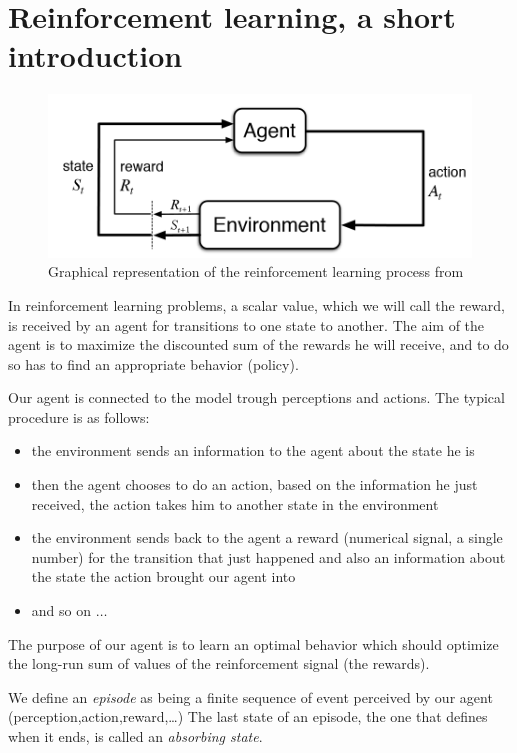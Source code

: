 \documentclass[14pt,a4paper]{article}
\theoremstyle{definition}
\begin{document}
\section{Reinforcement learning, a short introduction}

\begin{figure}[H]
\centering
\includegraphics[scale=0.5]{img/RL_graph.png}
\caption{Graphical representation of the reinforcement learning process from \citep{Sutton}}
\label{RL}
\end{figure}

In reinforcement learning problems, a scalar value, which we will call the reward, is received by an agent for transitions to one state to another. The aim of the agent is to maximize the discounted sum of the rewards he will receive, and to do so has to find an appropriate behavior (policy).


Our agent is connected to the model trough perceptions and actions. The typical procedure is as follows: 
\begin{itemize}
\item the environment sends an information to the agent about the state he is
\item then the agent chooses to do an action, based on the information he just received, the action takes him to another state in the environment
\item the environment sends back to the agent a reward (numerical signal, a single number) for the transition that just happened and also an information about the state the action brought our agent into
\item and so on $\ldots$
\end{itemize}

The purpose of our agent is to learn an optimal behavior which should optimize the long-run sum of values of the reinforcement signal (the rewards). \citep{KLMSurvey}

We define an \emph{episode} as being a finite sequence of event perceived by our agent (perception,action,reward,\ldots) The last state of an episode, the one that defines when it ends, is called an \emph{absorbing state}.
\end{document}
